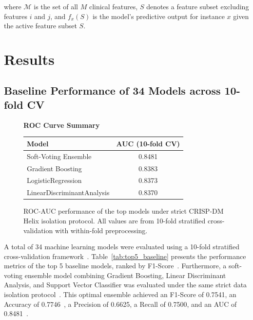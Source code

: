 \documentclass[3p,twocolumn]{elsarticle}
\begin{document}
where $\mathcal{M}$ is the set of all $M$ clinical features, $S$ denotes a feature subset excluding features $i$ and $j$, and $f_x(S)$ is the model's predictive output for instance $x$ given the active feature subset $S$.


\section{Results}

\subsection{Baseline Performance of 34 Models across 10-fold CV}

\begin{figure}[t]
\centering
\begin{minipage}{0.95\columnwidth}
\centering
\textbf{ROC Curve Summary}\\[0.3cm]
\begin{tabular}{lc}
\hline
\textbf{Model} & \textbf{AUC (10-fold CV)} \\
\hline
Soft-Voting Ensemble & 0.8481 \\
Gradient Boosting & 0.8383 \\
LogisticRegression & 0.8373 \\
LinearDiscriminantAnalysis & 0.8370 \\
\hline
\end{tabular}
\end{minipage}
\caption{ROC-AUC performance of the top models under strict CRISP-DM Helix isolation protocol. All values are from 10-fold stratified cross-validation with within-fold preprocessing.}
\label{fig:roc}
\end{figure}

A total of 34 machine learning models were evaluated using a 10-fold stratified cross-validation framework~\cite{Kapoor2024Leakage}. Table~\ref{tab:top5_baseline} presents the performance metrics of the top 5 baseline models, ranked by F1-Score~\cite{Kapoor2024Leakage}. Furthermore, a soft-voting ensemble model combining Gradient Boosting, Linear Discriminant Analysis, and Support Vector Classifier was evaluated under the same strict data isolation protocol~\cite{Kapoor2024Leakage}. This optimal ensemble achieved an F1-Score of 0.7541, an Accuracy of 0.7746~\cite{ProcessDriven}, a Precision of 0.6625, a Recall of 0.7500, and an AUC of 0.8481~\cite{Kapoor2024Leakage}.
\end{document}
